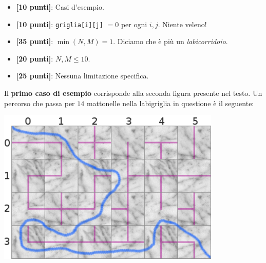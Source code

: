 \begin{itemize}[nolistsep,itemsep=2mm]
  \item \textbf{ [10 punti]}: Casi d'esempio.
  \item \textbf{ [10 punti]}: \texttt{griglia[i][j]} $=0$ per ogni $i, j$. Niente veleno!
  \item \textbf{ [35 punti]}: $\min(N, M) = 1$. Diciamo che è più un \emph{labicorridoio}.
  \item \textbf{ [20 punti]}: $N, M \le 10$.
  \item \textbf{ [25 punti]}: Nessuna limitazione specifica.
\end{itemize}



\Examples
\begin{example}
%
%
\end{example}


\Explanation
Il \textbf{primo caso di esempio} corrisponde alla seconda figura presente nel testo. Un percorso che passa per $14$ mattonelle nella labigriglia in questione è il seguente:

\begin{center}
  \includegraphics[width=0.8\textwidth]{floor-poison-path.png}
\end{center}
